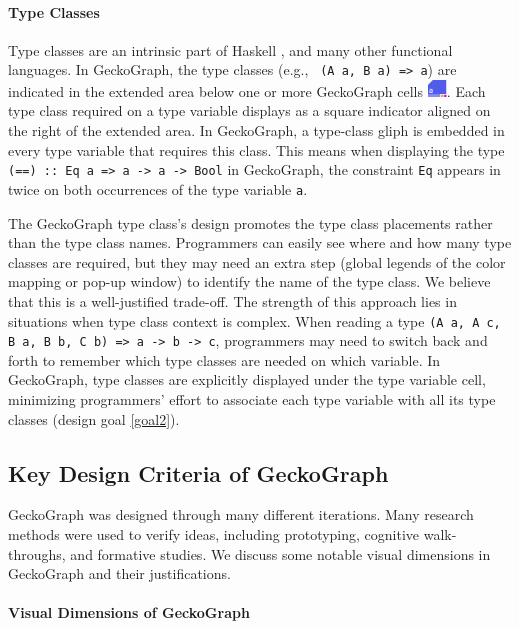 \documentclass[preprint,12pt]{elsarticle}
\begin{document}
 
\paragraph{Type Classes} 
Type classes are an intrinsic part of Haskell \cite{Hudak2007-kn}, and many other functional languages. In GeckoGraph, the type classes (e.g., \texttt{ (A a, B a) => a}) are indicated in the extended area below one or more GeckoGraph cells \includegraphics[height=1.2em]{figures/TypeClass.png}. Each type class required on a type variable displays as a square indicator aligned on the right of the extended area. In GeckoGraph, a type-class gliph is embedded in every type variable that requires this class. This means when displaying the type \texttt{(==) :: Eq a => 
a -> a -> Bool} in GeckoGraph, the constraint \texttt{Eq} appears in twice on both occurrences of the type variable \texttt{a}. 

The GeckoGraph type class's design promotes the type class placements rather than the type class names. Programmers can easily see where and how many type classes are required, but they may need an extra step (global legends of the color mapping or pop-up window) to identify the name of the type class. We believe that this is a well-justified trade-off. The strength of this approach lies in situations when type class context is complex. When reading a type \texttt{(A a, A c, B a, B b, C b) => a -> b -> c}, programmers may need to switch back and forth to remember which type classes are needed on which variable. In GeckoGraph, type classes are explicitly displayed under the type variable cell,  minimizing programmers' effort to associate each type variable with all its type classes (design goal \ref{goal2}). 


\subsection{Key Design Criteria of GeckoGraph}\label{sec:benefits}

GeckoGraph was designed through many different iterations. Many research methods were used to verify ideas, including prototyping, cognitive walk-throughs, and formative studies. We discuss some notable visual dimensions in GeckoGraph and their justifications.


\paragraph{Visual Dimensions of GeckoGraph}
\end{document}
